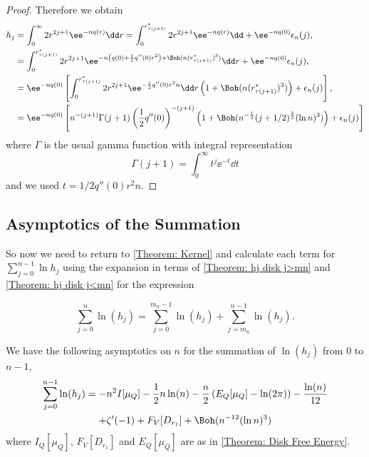 \begin{proof}
Therefore we obtain
\begin{align}
	h_j & = \int_{0}^{\infty} 2r^{2j+1} \ee^{-n q(r)} \dd r = \int_{0}^{r^*_{\tau(j+1)}} 2r^{2j+1} \ee^{-n q(r)} \dd + \ee^{-n q(0)} \epsilon_n(j), \\
	& = \int_{0}^{r^*_{\tau(j+1)}} 2r^{2j+1} \ee^{-n \left( q(0) + \frac{1}{2} q''(0) r^2 \right) + \Boh(n(r^*_{\tau(j+1)})^3)} \dd  r + \ee^{-n q(0)} \epsilon_n(j), \\
	& =  \ee^{-n q(0)} \left[ \int_{0}^{r^*_{\tau(j+1)}} 2r^{2j+1} \ee^{-\frac{1}{2} q''(0) r^2 n} \dd r \left( 1 + \Boh(n(r^*_{\tau(j+1)})^3) \right)+ \epsilon_n(j) \right], \\
	&=  \ee^{-n q(0)} \left[ n^{-(j+1)} \Gamma(j+1)\left(\frac{1}{2} q''(0)\right)^{-(j+1)} \left( 1 + \Boh(n^{-\frac{1}{2}} (j+1/2)^{\frac{3}{2}} (\ln n)^3) \right)+ \epsilon_n(j) \right]
\end{align}
where $\Gamma$ is the usual gamma function with integral representation
\begin{equation}
	\Gamma(j+1) = \int_{0}^{\infty} t^j \ee^{-t} \dd t
\end{equation}
and we used $t = 1/2 q''(0) r^2 n$.
  
\end{proof}

\subsection{Asymptotics of the Summation}

So now we need to return to  \autoref{Theorem: Kernel} and calculate each term for $	\sum_{j=0}^{n-1} \ln{h_j}$ using the expansion in terms of \autoref{Theorem: hj disk j>mn} and \autoref{Theorem: hj disk j<mn} for the expression

\begin{equation}
	\sum_{j=0}^{n} \ln(h_j) = \sum_{j=0}^{m_n - 1} \ln(h_j)  + \sum_{j=m_n}^{n - 1} \ln(h_j).
\end{equation}

\begin{teorema}	\label{Theorem: Disk sum}
	We have the following asymptotics on $n$ for the summation of $\ln(h_j)$ from $0$ to $n - 1$,
	\begin{multline}
		\sum_{j=0}^{n-1} \ln (h_j) = -n^2 I[\mu_Q] - \frac{1}{2} n \ln(n)  -\frac{n}{2} \left( E_Q[\mu_Q] - \ln(2\pi) \right) - \frac{\ln(n)}{12} \\ + \zeta'(-1) + F_V[D_{r_1}] + \Boh(n^{-12} (\ln n)^3)
	\end{multline}
	where $I_Q[\mu_Q] $, $F_V[D_{r_1}]$ and $E_Q[\mu_Q]$ are as in \autoref{Theorem: Disk Free Energy}.
\end{teorema}

